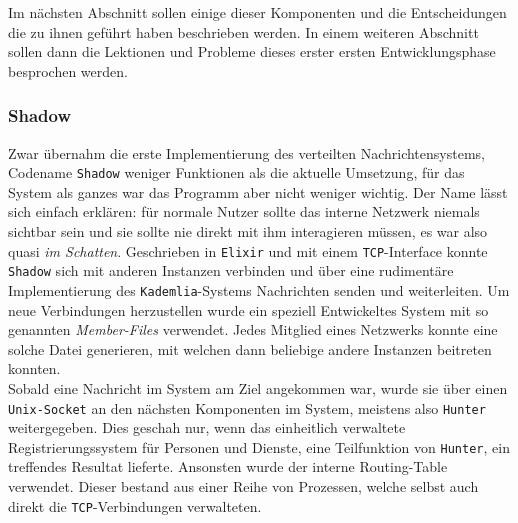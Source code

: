 \documentclass[11pt]{article}
\begin{document}
\noindent Im nächsten Abschnitt sollen einige dieser Komponenten und
die Entscheidungen die zu ihnen geführt haben beschrieben werden. In
einem weiteren Abschnitt sollen dann die Lektionen und Probleme dieses
erster ersten Entwicklungsphase besprochen werden. 
\subsubsection{Shadow}
\label{sec:org0b82e71}
Zwar übernahm die erste Implementierung des verteilten
Nachrichtensystems, Codename \texttt{Shadow} weniger Funktionen als die
aktuelle Umsetzung, für das System als ganzes war das Programm aber
nicht weniger wichtig. Der Name lässt sich einfach erklären: für
normale Nutzer sollte das interne Netzwerk niemals sichtbar sein und
sie sollte nie direkt mit ihm interagieren müssen, es war also quasi
\emph{im Schatten}. Geschrieben in \texttt{Elixir} und mit einem \texttt{TCP}-Interface konnte
\texttt{Shadow} sich mit anderen Instanzen verbinden und über eine rudimentäre
Implementierung des \texttt{Kademlia}-Systems Nachrichten senden und
weiterleiten. Um neue Verbindungen herzustellen wurde ein speziell
Entwickeltes System mit so genannten \emph{Member-Files} verwendet. Jedes
Mitglied eines Netzwerks konnte eine solche Datei generieren, mit
welchen dann beliebige andere Instanzen beitreten konnten.\\

\noindent Sobald eine Nachricht im System am Ziel angekommen war,
wurde sie über einen \texttt{Unix-Socket} an den nächsten Komponenten im
System, meistens also \texttt{Hunter} weitergegeben. Dies geschah nur, wenn das
einheitlich verwaltete Registrierungssystem für Personen und Dienste,
eine Teilfunktion von \texttt{Hunter}, ein treffendes Resultat lieferte.
Ansonsten wurde der interne Routing-Table verwendet. Dieser bestand
aus einer Reihe von Prozessen, welche selbst auch direkt die
\texttt{TCP}-Verbindungen verwalteten. 
\end{document}
